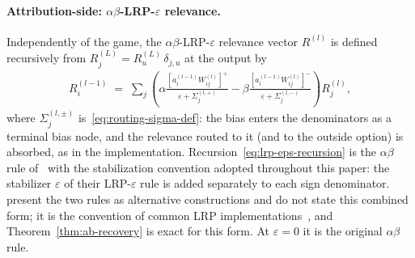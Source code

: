 \documentclass[twoside]{article}
\newif\ifch \chfalse
\newcommand{\ch}[1]{\ifch\textcolor{magenta}{#1}\else#1\fi}
\newcommand{\1}{\mathbf{1}}
\begin{document}
\paragraph{Attribution-side: \texorpdfstring{$\alpha\beta$-\ac{LRP}-$\varepsilon$}{alpha-beta-LRP-epsilon} relevance.}
Independently of the game, the $\alpha\beta$-\ac{LRP}-$\varepsilon$ relevance vector
$R^{(l)}$ is defined recursively from $R^{(L)}_j = R_u^{(L)}\,\delta_{j,u}$ at the output by
\begin{align}\label{eq:lrp-eps-recursion}
    R^{(l-1)}_i \;=\; \sum_j \left(
    \alpha \frac{[a_i^{(l-1)} W_{ij}^{(l)}]^+}{\varepsilon + \Sigma_j^{(l,+)}}
    -
    \beta \frac{[a_i^{(l-1)} W_{ij}^{(l)}]^-}{\varepsilon + \Sigma_j^{(l,-)}}
    \right) R^{(l)}_j,
\end{align}
where $\Sigma_j^{(l,\pm)}$ is~\eqref{eq:routing-sigma-def}: the bias enters the denominators as a
terminal bias node, and the relevance routed to it (and to the outside option) is absorbed, as in
the implementation. \ch{Recursion~\eqref{eq:lrp-eps-recursion} is the $\alpha\beta$ rule
of~\citet{Bach2015} with the stabilization convention adopted throughout this paper: the stabilizer
$\varepsilon$ of their \ac{LRP}-$\varepsilon$ rule is added separately to each sign denominator. \citet{Bach2015} present the two rules as alternative
constructions and do not state this combined form; it is the convention of common \ac{LRP}
implementations~\citep{Anders2021zennit}, and Theorem~\ref{thm:ab-recovery} is exact for this form.
At $\varepsilon = 0$ it is the original $\alpha\beta$ rule.}
\end{document}
